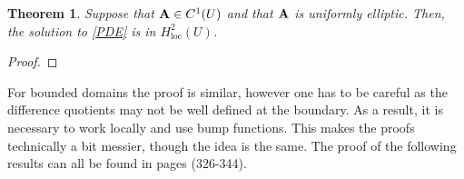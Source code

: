 \documentclass[
    a4paper,
    DIV=14,
    abstract=true,
    numbers=noenddot
]
{scrartcl}
\newtheorem{theorem}{Theorem}[section]
\theoremstyle{definition}
\begin{document}
\begin{theorem}\label{higher regularity}
    Suppose that $\vb{A}\in C^1(U)$ and that $\vb{A}$ is uniformly elliptic. Then, the solution to \eqref{PDE} is in $H^2_{\mathrm{loc}}(U)$.
\end{theorem}
\begin{proof}

\end{proof}

For bounded domains the proof is similar, however one has to be careful as the difference quotients may not be well defined at the boundary. As a result, it is necessary to work locally and use bump functions. This makes the proofs technically a bit messier, though the idea is the same. The proof of the following results can all be found in \cite{evans2022partial} pages (326-344).




\appendix










\end{document}

